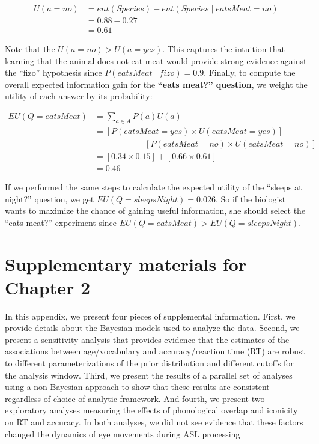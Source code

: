 \documentclass[oneside]{report}
\begin{document}
\[ 
\begin{aligned}
U(a = no) &= ent(Species) - ent(Species \mid eatsMeat = no)\\
&= 0.88 - 0.27 \\
&= 0.61
\end{aligned}
\]

\noindent
Note that the \(U(a = no) > U(a = yes)\). This captures the intuition
that learning that the animal does not eat meat would provide strong
evidence against the ``fizo'' hypothesis since
\(P(eatsMeat \mid fizo) = 0.9\). Finally, to compute the overall
expected information gain for the \textbf{``eats meat?'' question}, we
weight the utility of each answer by its probability:

\[
\begin{aligned}
EU(Q = eatsMeat) &= \sum_{a\in A}{P(a)U(a)} \\
&= [P(eatsMeat = yes) \times U(eatsMeat = yes)] + \\& \qquad \qquad \qquad [P(eatsMeat = no) \times U(eatsMeat = no)]\\
&= [0.34 \times 0.15] + [0.66 \times 0.61]\\
&= 0.46
\end{aligned}
\]

If we performed the same steps to calculate the expected utility of the
``sleeps at night?'' question, we get \(EU(Q = sleepsNight) = 0.026\).
So if the biologist wants to maximize the chance of gaining useful
information, she should select the ``eats meat?'' experiment since
\(EU(Q = eatsMeat) > EU(Q = sleepsNight)\).

\chapter{Supplementary materials for Chapter
2}\label{supplementary-materials-for-chapter-2}

In this appendix, we present four pieces of supplemental information.
First, we provide details about the Bayesian models used to analyze the
data. Second, we present a sensitivity analysis that provides evidence
that the estimates of the associations between age/vocabulary and
accuracy/reaction time (RT) are robust to different parameterizations of
the prior distribution and different cutoffs for the analysis window.
Third, we present the results of a parallel set of analyses using a
non-Bayesian approach to show that these results are consistent
regardless of choice of analytic framework. And fourth, we present two
exploratory analyses measuring the effects of phonological overlap and
iconicity on RT and accuracy. In both analyses, we did not see evidence
that these factors changed the dynamics of eye movements during ASL
processing
\end{document}

